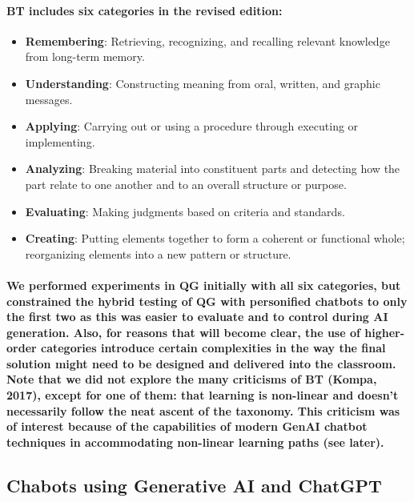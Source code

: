 \documentclass{article}
\begin{document}
\paragraph{BT includes six categories in the revised edition:}

\begin{itemize}
    \item \textbf{Remembering}: Retrieving, recognizing, and recalling relevant knowledge from long-term memory.
    \item \textbf{Understanding}: Constructing meaning from oral, written, and graphic messages.
    \item \textbf{Applying}: Carrying out or using a procedure through executing or implementing.
    \item \textbf{Analyzing}: Breaking material into constituent parts and detecting how the part relate to one another and to an overall structure or purpose.
    \item \textbf{Evaluating}: Making judgments based on criteria and standards.
    \item \textbf{Creating}: Putting elements together to form a coherent or functional whole; reorganizing elements into a new pattern or structure.

\end{itemize}

\paragraph{We performed experiments in QG initially with all six categories, but constrained the hybrid testing of QG with personified chatbots to only the first two as this was easier to evaluate and to control during AI generation. Also, for reasons that will become clear, the use of higher-order categories introduce certain complexities in the way the final solution might need to be designed and delivered into the classroom. Note that we did not explore the many criticisms of BT (Kompa, 2017), except for one of them: that learning is non-linear and doesn’t necessarily follow the neat ascent of the taxonomy. This criticism was of interest because of the capabilities of modern GenAI chatbot techniques in accommodating non-linear learning paths (see later).}

\subsection*{Chabots using Generative AI and ChatGPT}
\end{document}
